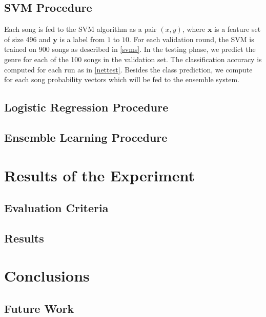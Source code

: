 \documentclass[a4paper,11pt,oneside]{article}
\begin{document}
\subsection{SVM Procedure}
Each song is fed to the SVM algorithm as a pair $(x,y)$, where $\mathbf{x}$ is a feature set of size 496 
and $\mathbf{y}$ is a label from $1$ to $10$. For each validation round, the SVM is trained on 900 songs
as described in \ref{svms}. In the testing phase, we predict the genre for each of the 100 songs in the validation set.
The classification accuracy is computed for each run as in \ref{nettest}. Besides the class prediction, we compute
for each song probability vectors which will be fed to the ensemble system.
\subsection{Logistic Regression Procedure}
\subsection{Ensemble Learning Procedure}
\section{Results of the Experiment}
\subsection*{Evaluation Criteria}
\subsection*{Results}
\section{Conclusions}
\subsection{Future Work}
\nocite{*}
\newpage


\end{document}
